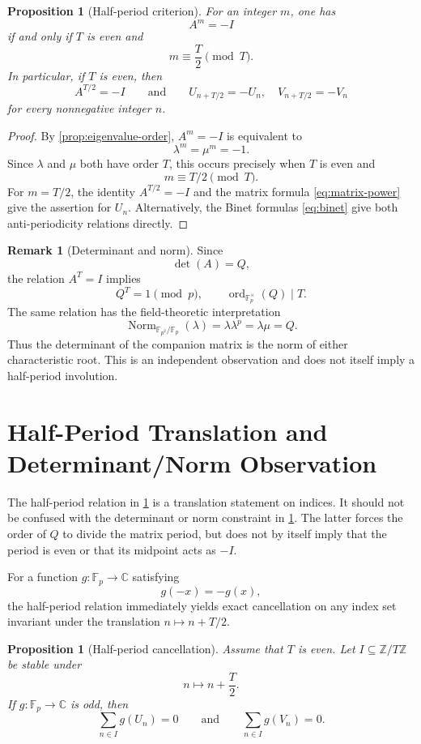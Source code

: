 \documentclass[11pt]{article}
\newcommand{\ord}{\operatorname{ord}}
\newcommand{\Norm}{\operatorname{Norm}}
\newcommand{\Fp}{\mathbb{F}_p}
\newcommand{\Fpq}{\mathbb{F}_{p^2}}
\newcommand{\Z}{\mathbb{Z}}
\theoremstyle{plain}
\newtheorem{proposition}[theorem]{Proposition}
\theoremstyle{definition}
\newtheorem{remark}[theorem]{Remark}
\begin{document}
\begin{proposition}[Half-period criterion]
\label{prop:half-period-criterion}
For an integer $m$, one has
\[
 A^m=-I
\]
if and only if $T$ is even and
\[
 m\equiv \frac{T}{2}\pmod T.
\]
In particular, if $T$ is even, then
\[
 A^{T/2}=-I
 \qquad\text{and}\qquad
 U_{n+T/2}=-U_n,\quad
 V_{n+T/2}=-V_n
\]
for every nonnegative integer $n$.
\end{proposition}

\begin{proof}
By \cref{prop:eigenvalue-order}, $A^m=-I$ is equivalent to
\[
 \lambda^m=\mu^m=-1.
\]
Since $\lambda$ and $\mu$ both have order $T$, this occurs precisely when $T$ is even and
\[
 m\equiv T/2\pmod T.
\]
For $m=T/2$, the identity $A^{T/2}=-I$ and the matrix formula \eqref{eq:matrix-power} give the assertion for $U_n$. Alternatively, the Binet formulas \eqref{eq:binet} give both anti-periodicity relations directly.
\end{proof}

\begin{remark}[Determinant and norm]
\label{rem:determinant-norm}
Since
\[
 \det(A)=Q,
\]
the relation $A^T=I$ implies
\[
 Q^T=1\pmod p,
 \qquad
 \ord_{\Fp^\times}(Q)\mid T.
\]
The same relation has the field-theoretic interpretation
\[
 \Norm_{\Fpq/\Fp}(\lambda)=\lambda\lambda^p
 =\lambda\mu=Q.
\]
Thus the determinant of the companion matrix is the norm of either characteristic root. This is an independent observation and does not itself imply a half-period involution.
\end{remark}

\section{Half-Period Translation and Determinant/Norm Observation}

The half-period relation in \cref{prop:half-period-criterion} is a translation statement on indices. It should not be confused with the determinant or norm constraint in \cref{rem:determinant-norm}. The latter forces the order of $Q$ to divide the matrix period, but does not by itself imply that the period is even or that its midpoint acts as $-I$.

For a function $g:\Fp\to\mathbb{C}$ satisfying
\[
 g(-x)=-g(x),
\]
the half-period relation immediately yields exact cancellation on any index set invariant under the translation $n\mapsto n+T/2$.

\begin{proposition}[Half-period cancellation]
\label{prop:half-period-cancellation}
Assume that $T$ is even. Let
$I\subseteq\Z/T\Z$ be stable under
\[
 n\longmapsto n+\frac{T}{2}.
\]
If $g:\Fp\to\mathbb{C}$ is odd, then
\[
 \sum_{n\in I}g(U_n)=0
 \qquad\text{and}\qquad
 \sum_{n\in I}g(V_n)=0.
\]
\end{proposition}
\end{document}
